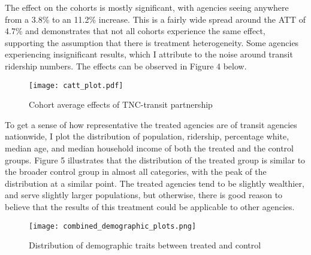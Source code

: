 \documentclass [12pt]{report}
\begin{document}
\indent The effect on the cohorts is mostly significant, with agencies seeing anywhere from a 3.8\% to an 11.2\% increase. This is a fairly wide spread around the ATT of 4.7\% and demonstrates that not all cohorts experience the same effect, supporting the assumption that there is treatment heterogeneity. Some agencies experiencing insignificant results, which I attribute to the noise around transit ridership numbers. The effects can be observed in Figure 4 below.
\begin{figure}[H]
    \centering
    \texttt{[image: catt\_plot.pdf]} %
    \caption{Cohort average effects of TNC-transit partnership}
\end{figure}

\indent To get a sense of how representative the treated agencies are of transit agencies nationwide, I plot the distribution of population, ridership, percentage white, median age, and median household income of both the treated and the control groups. Figure 5 illustrates that the distribution of the treated group is similar to the broader control group in almost all categories, with the peak of the distribution at a similar point. The treated agencies tend to be slightly wealthier, and serve slightly larger populations, but otherwise, there is good reason to believe that the results of this treatment could be applicable to other agencies.
\begin{figure}[H]
    \centering
    \texttt{[image: combined\_demographic\_plots.png]} %
    \caption{Distribution of demographic traits between treated and control}
\end{figure}

\end{document}
